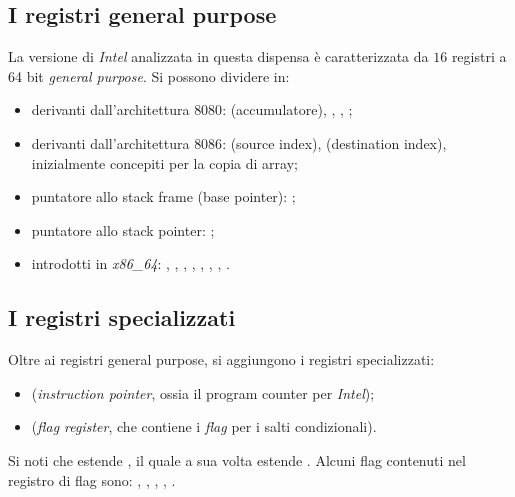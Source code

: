 \documentclass[class=book, crop=false, oneside]{standalone}
\begin{document}
\subsection{I registri general purpose}
La versione di \emph{Intel} analizzata in questa dispensa è caratterizzata da \(16\) registri a 64 bit \emph{general purpose}. Si possono dividere in:
\begin{itemize}
	\item derivanti dall'architettura \(8080\):  (accumulatore), , , ;
	\item derivanti dall'architettura \(8086\):  (source index),  (destination index), inizialmente concepiti per la copia di array;
	\item puntatore allo stack frame (base pointer): ;
	\item puntatore allo stack pointer: ;
	\item introdotti in \emph{x86\_64}: , , , , , , , .
\end{itemize}

\subsection{I registri specializzati}
Oltre ai registri general purpose, si aggiungono i registri specializzati:
\begin{itemize}
	\item {} (\emph{instruction pointer}, ossia il program counter per \emph{Intel});
	\item {} (\emph{flag register}, che contiene i \emph{flag} per i salti condizionali).
\end{itemize}
Si noti che  estende , il quale a sua volta estende . Alcuni flag contenuti nel registro di flag sono: , , , , .
\end{document}
